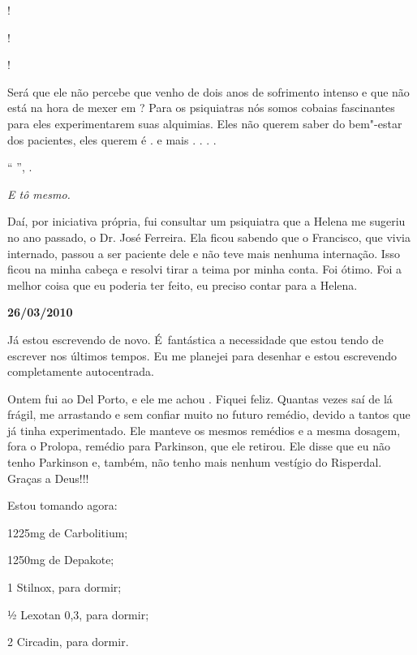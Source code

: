 !

!

!

Será que ele não percebe que venho de dois anos de sofrimento intenso e
que não está na hora de mexer em  ? Para os psiquiatras nós
somos cobaias fascinantes para eles experimentarem suas alquimias. Eles
não querem saber do bem"-estar dos pacientes, eles querem é 
.  e mais . . . .

`` '',  .

\emph{E tô mesmo.}

Daí, por iniciativa própria, fui consultar um psiquiatra que a Helena me
sugeriu no ano passado, o Dr. José Ferreira. Ela ficou sabendo que o
Francisco, que vivia internado, passou a ser paciente dele e não teve
mais nenhuma internação. Isso ficou na minha cabeça e resolvi tirar a
teima por minha conta. Foi ótimo. Foi a melhor coisa que eu poderia ter
feito, eu preciso contar para a Helena.

\begin{center}\textbf{\asterisc{}}\end{center}


\begin{flushright}\textbf{26/03/2010}\end{flushright}


Já estou escrevendo de novo. É~fantástica a necessidade que estou tendo
de escrever nos últimos tempos. Eu me planejei para desenhar e estou
escrevendo completamente autocentrada.

Ontem fui ao Del Porto, e ele me achou . Fiquei feliz. Quantas
vezes saí de lá frágil, me arrastando e sem confiar muito no futuro
remédio, devido a tantos que já tinha experimentado. Ele manteve os
mesmos remédios e a mesma dosagem, fora o Prolopa, remédio para
Parkinson, que ele retirou. Ele disse que eu não tenho Parkinson e,
também, não tenho mais nenhum vestígio do Risperdal. Graças a Deus!!!

Estou tomando agora:

1225mg de Carbolitium;

1250mg de Depakote;

1 Stilnox, para dormir;

½ Lexotan 0,3, para dormir;

2 Circadin, para dormir.

